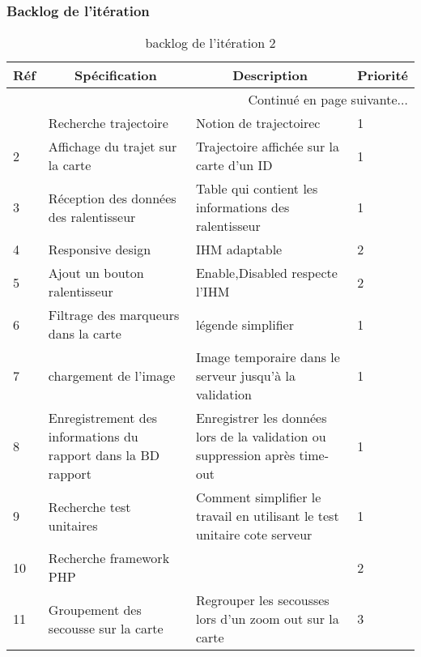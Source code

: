   \subsubsection{Backlog de l'itération}
 \begin{center}

    \footnotesize
    \begin{longtable}{| p{1cm} | p{5cm} | p{7cm} | p{1cm} |}
        \caption{backlog de l'itération 2}
        \label{tab:sprint2-backlog} \\

 \hline
 \multicolumn{1}{|c}{\textbf{Réf}} &
 \multicolumn{1}{|c}{\textbf{Spécification}} &
 \multicolumn{1}{|c}{\textbf{Description}} &
 \multicolumn{1}{|c|}{\textbf{Priorité}} \\ \hline
 \endhead

 \hline \multicolumn{4}{|r|}{{Continué en page suivante$\dotsc$}} \\ \hline
 \endfoot

 \hline \hline
 \endlastfoot

\hline
1 & Recherche trajectoire & Notion de trajectoirec & 1 \\ \hline
2 & Affichage du trajet sur la carte&Trajectoire affichée sur la carte d'un ID  & 1 \\ \hline
3 &Réception des données des ralentisseur &Table qui contient les informations des ralentisseur & 1 \\ \hline
4&Responsive design& IHM adaptable & 2 \\ \hline
5 & Ajout un bouton ralentisseur &Enable,Disabled respecte l'IHM  & 2 \\ \hline
6 & Filtrage des marqueurs dans la carte & légende simplifier & 1 \\ \hline
7 & chargement de l'image & Image temporaire dans le serveur jusqu'à la validation & 1 \\ \hline
8 & Enregistrement des informations du rapport dans la BD rapport& Enregistrer les données lors de la validation ou suppression après time-out & 1 \\ \hline
9 & Recherche test unitaires & Comment simplifier le travail en utilisant le test unitaire cote serveur  & 1 \\ \hline
10 & Recherche framework PHP & & 2 \\ \hline 
11 &Groupement des secousse sur la carte & Regrouper les secousses lors d'un zoom out sur la carte & 3 \\ \hline
\end{longtable}
\end{center}

